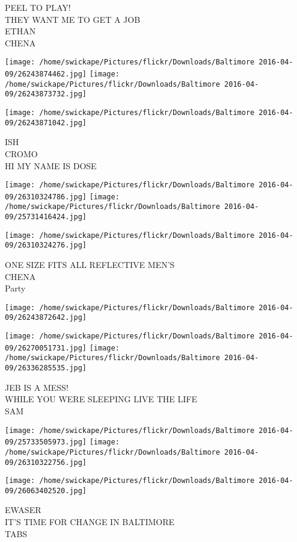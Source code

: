 \documentclass[10pt,letterpaper]{article}
\begin{document}
PEEL TO PLAY!\\
THEY WANT ME TO GET A JOB\\
ETHAN\\
CHENA\\
\pagebreak

\texttt{[image: /home/swickape/Pictures/flickr/Downloads/Baltimore 2016-04-09/26243874462.jpg]}
\texttt{[image: /home/swickape/Pictures/flickr/Downloads/Baltimore 2016-04-09/26243873732.jpg]}

\vspace{0.25in}
\texttt{[image: /home/swickape/Pictures/flickr/Downloads/Baltimore 2016-04-09/26243871042.jpg]}

ISH\\
CROMO\\
HI MY NAME IS DOSE\\
\pagebreak

\texttt{[image: /home/swickape/Pictures/flickr/Downloads/Baltimore 2016-04-09/26310324786.jpg]}
\texttt{[image: /home/swickape/Pictures/flickr/Downloads/Baltimore 2016-04-09/25731416424.jpg]}

\vspace{0.25in}
\texttt{[image: /home/swickape/Pictures/flickr/Downloads/Baltimore 2016-04-09/26310324276.jpg]}

ONE SIZE FITS ALL REFLECTIVE MEN'S\\
CHENA\\
Party\\
\pagebreak

\texttt{[image: /home/swickape/Pictures/flickr/Downloads/Baltimore 2016-04-09/26243872642.jpg]}

\vspace{0.25in}
\texttt{[image: /home/swickape/Pictures/flickr/Downloads/Baltimore 2016-04-09/26270051731.jpg]}
\texttt{[image: /home/swickape/Pictures/flickr/Downloads/Baltimore 2016-04-09/26336285535.jpg]}

JEB IS A MESS!\\
WHILE YOU WERE SLEEPING LIVE THE LIFE\\
SAM\\
\pagebreak

\texttt{[image: /home/swickape/Pictures/flickr/Downloads/Baltimore 2016-04-09/25733505973.jpg]}
\texttt{[image: /home/swickape/Pictures/flickr/Downloads/Baltimore 2016-04-09/26310322756.jpg]}

\texttt{[image: /home/swickape/Pictures/flickr/Downloads/Baltimore 2016-04-09/26063402520.jpg]}

EWASER\\
IT'S TIME FOR CHANGE IN BALTIMORE\\
TABS\\
\pagebreak
\end{document}
